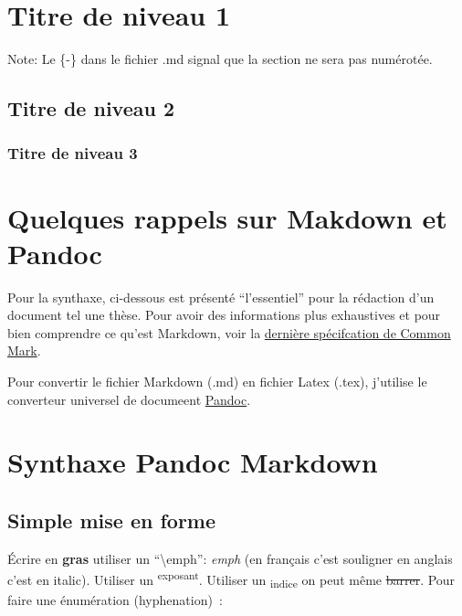 \section*{Titre de niveau 1}\label{titre-de-niveau-1}

Note: Le \{-\} dans le fichier .md signal que la section ne sera pas
numérotée.

\subsection*{Titre de niveau 2}\label{titre-de-niveau-2}

\subsubsection*{Titre de niveau 3}\label{titre-de-niveau-3}

\section{Quelques rappels sur Makdown et
Pandoc}\label{quelques-rappels-sur-makdown-et-pandoc}

Pour la synthaxe, ci-dessous est présenté ``l'essentiel'' pour la
rédaction d'un document tel une thèse. Pour avoir des informations plus
exhaustives et pour bien comprendre ce qu'est Markdown, voir la
\href{http://spec.commonmark.org/0.25/}{dernière spécifcation de Common
Mark}.

Pour convertir le fichier Markdown (.md) en fichier Latex (.tex),
j'utilise le converteur universel de documeent
\href{http://pandoc.org}{Pandoc}.

\section*{Synthaxe Pandoc Markdown}\label{synthaxe-pandoc-markdown}

\subsection*{Simple mise en forme}\label{simple-mise-en-forme}

Écrire en \textbf{gras} utiliser un ``\textbackslash{}emph'':
\emph{emph} (en français c'est souligner en anglais c'est en italic).
Utiliser un \textsuperscript{exposant}. Utiliser un
\textsubscript{indice} on peut même \sout{barrer}. Pour faire une
énumération (hyphenation)~:

